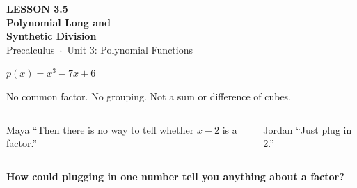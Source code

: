 \documentclass[aspectratio=169, 11pt]{beamer}
\begin{document}
{
\begin{frame}[plain]
  \vspace{2.6cm}\hspace{0.55cm}%
  \begin{minipage}{0.9\textwidth}
    {\color{goldacc}\bfseries\small LESSON 3.5}\\[0.5cm]
    {\color{white}\bfseries\Large Polynomial Long and}\\[0.2cm]
    {\color{white}\bfseries\Large Synthetic Division}\\[1.0cm]
    {\color{lilacmid}\small Precalculus~$\cdot$~Unit 3: Polynomial Functions}
  \end{minipage}
\end{frame}
}

\begin{frame}[t, plain]

  \begin{center}
    {\Large $p(x) = x^3 - 7x + 6$}
  \end{center}

  No common factor. No grouping. Not a sum or difference of cubes.

  \bigskip
  \begin{columns}[T]
      \begin{block}{Maya}
        ``Then there is no way to tell whether $x - 2$ is a factor.''
      \end{block}
      \begin{block}{Jordan}
        ``Just plug in 2.''
      \end{block}
  \end{columns}

  \bigskip
  \begin{center}
    {\large\bfseries\color{plum} How could plugging in one number tell you anything about a factor?}
  \end{center}
\end{frame}
\end{document}

